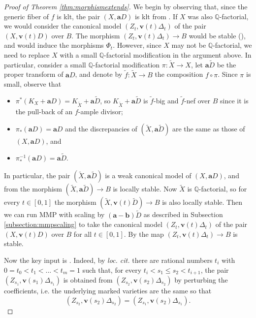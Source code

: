 \documentclass[11pt]{amsart}
\theoremstyle{definition}
\theoremstyle{remark}
\newcommand{\tildeD}{\widetilde{D}}
\newcommand{\tildeX}{\widetilde{X}}
\newcommand{\bfa}{\mathbf{a}}
\newcommand{\bfb}{\mathbf{b}}
\begin{document}
	\begin{proof}[Proof of Theorem \ref{thm:morphismextends}]
		We begin by observing that, since the generic fiber of $f$ is klt, the pair $(X,\mathbf{a}D)$ is klt from \cite[Corollary 4.56]{kollarmodulibook}. If $X$ was also $\mathbb{Q}$-factorial, we would consider
		the canonical model $(Z_t,\mathbf{v}(t)\Delta_t)$ of the pair $(X,\mathbf{v}(t)D)$ over $B$. The morphism $(Z_t,\mathbf{v}(t)\Delta_t)\to B$ would be stable (\cite[Corollary 4.57]{kollarmodulibook}), and would induce the morphisms $\Phi_t$.
		However, since $X$ may not be $\mathbb{Q}$-factorial, we need to replace $X$ with a small $\mathbb{Q}$-factorial modification in the argument above. 
		In particular, consider a small $\mathbb{Q}$-factorial modification $\pi: \tildeX \to X$, let $\mathbf{a}\tildeD$ be the proper transform of $\mathbf{a}D$, and denote by $\tilde{f} : \tildeX \to B$ the composition $f \circ \pi$. Since $\pi$ is small, observe that
		\begin{itemize}
			\item $\pi^*(K_X+\mathbf{a}D)= K_{\tildeX}+\mathbf{a}\tildeD$, so $K_{\tildeX} + \mathbf{a}\tildeD$ is $\tilde{f}$-big and $\tilde{f}$-nef over $B$ since it is the pull-back of an $f$-ample divisor;
			\item $\pi_*(\bfa D) = \bfa D$ and the discrepancies of $(\tildeX,\mathbf{a}\tildeD)$ are the same as those of $(X,\mathbf{a}D)$, and
			\item $\pi^{-1}_*(\mathbf{a}D) = \mathbf{a}\tildeD$.
		\end{itemize}
		In particular, the pair $(\tildeX,\mathbf{a}\tildeD)$ is a weak canonical model of $(X,\mathbf{a}D)$, and from \cite[Corollary 4.57]{kollarmodulibook} the morphism $(\tildeX,\mathbf{a}\tildeD)\to B$ is locally stable. Now $\tildeX$ is $\mathbb{Q}$-factorial, so for every $t \in [0,1]$ the morphism $(\tildeX,\mathbf{v}(t)\tildeD)\to B$ is also locally stable. Then we can run MMP with scaling by $(\bfa - \bfb)\tilde{D}$ as described in Subsection \ref{subsection:mmpscaling} to take the canonical model $(Z_t,\mathbf{v}(t)\Delta_t)$ of the pair $(X,\mathbf{v}(t)D)$ over $B$ for all $t \in [0,1]$. By \cite[Corollary 4.57]{kollarmodulibook} the map $(Z_t,\mathbf{v}(t)\Delta_t)\to B$ is stable.  
		
		
		Now the key input is \cite[Corollary 1.1.5]{BCHM10}. Indeed, by \emph{loc. cit.} there are rational numbers $t_i$ with $0=t_0 < t_1 < ... <t_m=1$
		such that, for every $t_i < s_1 \le s_2 < t_{i+1}$, the pair $(Z_{s_1},\mathbf{v}(s_1) \Delta_{s_1})$ is
		obtained from $(Z_{s_2},\mathbf{v}(s_2) \Delta_{s_2})$ by perturbing the coefficients, i.e. the underlying marked varieties are the same so that $$(Z_{s_2},\mathbf{v}(s_2) \Delta_{s_2})=(Z_{s_1},\mathbf{v}(s_2) \Delta_{s_1}).$$ 
		

\end{proof}
\end{document}
